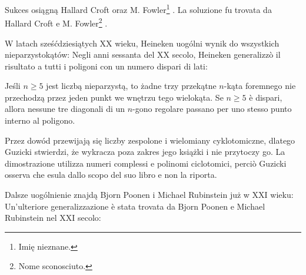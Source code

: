 Sukces osiągną Hallard Croft oraz M. Fowler\footnote{Imię nieznane.} \cite{croft_fowler_1961}. %
La soluzione fu trovata da Hallard Croft e M. Fowler\footnote{Nome sconosciuto.} \cite{croft_fowler_1961}. %
%
%

W latach sześćdziesiątych XX wieku, Heineken uogólni wynik do wszystkich nieparzystokątów: %
Negli anni sessanta del XX secolo, Heineken generalizzò il risultato a tutti i poligoni con un numero dispari di lati: %
%

\begin{proposition}
[Heinekena] %
[di Heineken] %
Jeśli $n \ge 5$ jest liczbą nieparzystą, to żadne trzy przekątne $n$-kąta foremnego nie przechodzą przez jeden punkt we wnętrzu tego wielokąta. %
Se $n \ge 5$ è dispari, allora nessune tre diagonali di un $n$-gono regolare passano per uno stesso punto interno al poligono. %
\end{proposition}

Przez dowód przewijają się liczby zespolone i wielomiany cyklotomiczne, dlatego Guzicki \cite[s. 422]{guzicki_2021} stwierdzi, że wykracza poza zakres jego książki i nie przytoczy go. %
La dimostrazione utilizza numeri complessi e polinomi ciclotomici, perciò Guzicki \cite[s. 422]{guzicki_2021} osserva che esula dallo scopo del suo libro e non la riporta. %

Dalsze uogólnienie znajdą Bjorn Poonen i Michael Rubinstein \cite{poonen_rubinstein_2006} już w XXI wieku: %
Un'ulteriore generalizzazione è stata trovata da Bjorn Poonen e Michael Rubinstein \cite{poonen_rubinstein_2006} nel XXI secolo: %
%
%

